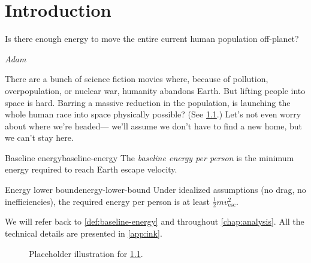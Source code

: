 
\chapter{Introduction}
\label{chap:intro}

\epigraph{%
    Is there enough energy to move the entire current human population off-planet?
}{\textit{Adam}}

There are a bunch of science fiction movies where,
because of pollution, overpopulation, or nuclear war, humanity abandons Earth.
But lifting people into space is hard.
Barring a massive reduction in the population,
is launching the whole human race into space physically possible?
(See \cref{fig:the-plan}.)
Let's not even worry about where we're headed---%
we'll assume we don't have to find a new home, but we can't stay here.

\begin{definition}{Baseline energy}{baseline-energy}
The \emph{baseline energy per person} is the minimum energy required to reach Earth escape velocity.
\end{definition}

\begin{theorem}{Energy lower bound}{energy-lower-bound}
Under idealized assumptions (no drag, no inefficiencies), the required energy per person is at least $\tfrac12 m v_\text{esc}^2$.
\end{theorem}

We will refer back to \cref{def:baseline-energy} and  throughout \cref{chap:analysis}. All the technical details are presented in \cref{app:ink}.


\begin{figure}[hp]
\centering
\fbox{\rule{0pt}{0.28\textheight}\rule{0.9\textwidth}{0pt}}
\caption{Placeholder illustration for \cref{fig:the-plan}.}
\label{fig:the-plan}
\end{figure}
